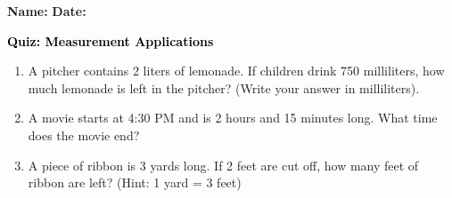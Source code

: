 \documentclass[12pt, letterpaper, fleqn]{article}
\begin{document}
\textbf{Name:} \underline{\hspace{5cm}}
\hfill
\textbf{Date:} \underline{\hspace{3cm}}\\

\begin{tcolorbox}[colback=customteal!20]
    \large\textcolor{black}{\textbf{Quiz: Measurement Applications}}
\end{tcolorbox}
\begin{enumerate}[itemsep=3.5cm, leftmargin=0.6cm]
\item A pitcher contains 2 liters of lemonade. If children drink 750 milliliters, how much lemonade is left in the pitcher? (Write your answer in milliliters).
\vspace{3.5cm}
\item A movie starts at 4:30 PM and is 2 hours and 15 minutes long. What time does the movie end?
\vspace{3.5cm}
\item A piece of ribbon is 3 yards long. If 2 feet are cut off, how many feet of ribbon are left? (Hint: 1 yard = 3 feet)
\end{enumerate}
\end{document}
